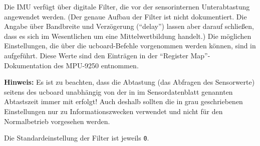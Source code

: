 Die IMU verfügt über digitale Filter, die vor der sensorinternen Unterabtastung angewendet werden. (Der genaue Aufbau der Filter ist nicht dokumentiert. Die Angabe über Bandbreite und Verzögerung ("`delay"') lassen aber darauf schließen, dass es sich im Wesentlichen um eine Mittelwertbildung handelt.) Die möglichen Einstellungen, die über die ucboard-Befehle vorgenommen werden können, sind in  aufgeführt. Diese Werte sind den Einträgen in der "`Register Map"'-Dokumentation des MPU-9250 entnommen. 

\textbf{Hinweis:} Es ist zu beachten, dass die Abtastung (das Abfragen des Sensorwerte) seitens des ucboard unabhängig von der in  \bzw im Sensordatenblatt genannten Abtastszeit immer mit  erfolgt! Auch deshalb sollten die in  grau geschriebenen Einstellungen nur zu Informationszwecken verwendet und nicht für den Normalbetrieb vorgesehen werden.

Die Standardeinstellung der Filter ist jeweils \verb|0|.

